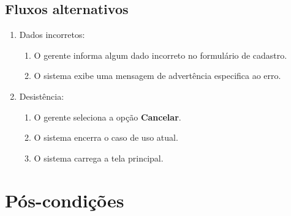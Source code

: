 \subsection{Fluxos alternativos}

\begin{enumerate}
	\item Dados incorretos:
	\begin{enumerate}
		\item O gerente informa algum dado incorreto no formulário de cadastro. 
		\item O sistema exibe uma mensagem de advertência especifica ao erro.
	\end{enumerate}	
	\item Desistência:
	\begin{enumerate}
		\item O gerente seleciona a opção \textbf{Cancelar}.
		\item O sistema encerra o caso de uso atual.
		\item O sistema carrega a tela principal.
	\end{enumerate}
\end{enumerate}



\section{Pós-condições}


